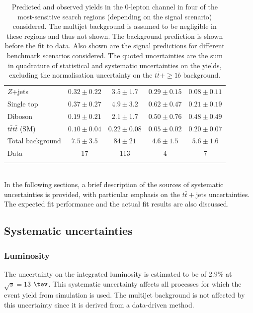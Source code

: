 \begin{table}[htb!]
\begin{center}
\begin{tabular}{l*{4}{c}}
$Z$+jets & $ 0.32 \pm 0.22 $ &   $ 3.5 \pm 1.7 $ &   $ 0.29 \pm 0.15 $ &   $ 0.08 \pm 0.11 $ \\ 
Single top & $ 0.37 \pm 0.27 $ &   $ 4.9 \pm 3.2 $ &   $ 0.62 \pm 0.47 $ &   $ 0.21 \pm 0.19 $ \\ 
Diboson & $ 0.19 \pm 0.21 $ &   $ 2.1 \pm 1.7 $ &   $ 0.50 \pm 0.76 $ &   $ 0.48 \pm 0.49 $ \\  
$t\bar{t}t\bar{t}$ (SM) &   $ 0.10 \pm 0.04 $ &   $ 0.22 \pm 0.08 $ &   $ 0.05 \pm 0.02 $ &   $ 0.20 \pm 0.07 $ \\ 
\midrule
Total background & $ 7.5 \pm 3.5 $ &   $ 84 \pm 21 $ &   $ 4.6 \pm 1.5 $ &   $ 5.6 \pm 1.6 $ \\
\midrule
Data & 17  & 113  & 4  & 7  \\ 
\bottomrule\bottomrule     \\
\end{tabular}
\vspace{0.1cm}
\end{center}
\vspace{-0.5cm}
\captionsetup{width=0.85\textwidth} \caption{\small Predicted and observed yields in the 0-lepton channel in four of the most-sensitive search regions  (depending on the signal scenario) considered. 
The multijet background is assumed to be negligible in these regions and thus not shown. The background prediction is shown before the fit to data. Also shown are the signal predictions for different benchmark scenarios considered. The quoted uncertainties are the sum in quadrature of statistical and systematic uncertainties on the yields, excluding the normalisation uncertainty on the $t\bar{t}+\ge1b$ background. }
\label{tab:VLQ:fit:PrefitYields0Lunblind}
\end{table}
\\ \indent In the following sections, a brief description of the sources of systematic uncertainties is provided, with particular emphasis on the $t\bar{t}+$jets uncertainties. The expected fit performance and the actual fit results are also discussed. 

\subsection{Systematic uncertainties}
\label{chp:vlq:sec:syst}
\subsubsection{Luminosity}
The uncertainty on the integrated luminosity is estimated to be of $2.9\%$ at $\sqrt{s} =13$ $\tev$. This systematic uncertainty affects all processes for which the event yield from simulation is used. The multijet background is not affected by this uncertainty since it is derived from a data-driven method.

